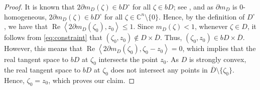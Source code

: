 \documentclass[11pt, oneside, reqno]{amsart}
\numberwithin{equation}{section}
\theoremstyle{definition}
\newcommand{\C}{\mathbb C}
\newcommand{\rea}{\operatorname{Re}}
\newcommand{\ltt}{\left(}
\newcommand{\rtt}{\right)}
\begin{document}
{\begin{proof}
It is known that $2\partial m_D(\zeta)\in bD^\circ$ for all $\zeta\in bD$; see {\cite[Section 2]{Li02}}, and as $\partial m_D$ is $0$-homogeneous, $2\partial m_D(\zeta)\in bD^\circ$ for all $\zeta\in\C^n\setminus\{0\}.$ Hence, by the definition of $D^\circ$, we have that $\rea\left\langle2\partial m_D(\zeta_0),z_0\right\rangle\leq 1$. Since $m_D(\zeta)<1$, whenever $\zeta\in D$, it follows from \eqref{eq:constraint} that $\ltt\zeta_0,z_0\rtt\notin{D}\times \overline D$. Thus,  $\ltt\zeta_0,z_0\rtt\in bD\times \overline{D}$. However, this means that $\rea\left\langle2\partial m_D(\zeta_0),\zeta_0-z_0\right\rangle=0$, which implies that the real tangent space to $bD$ at $\zeta_0$ intersects the point $z_0$. As $D$ is strongly convex, the real tangent space to $bD$ at $\zeta_0$ does not intersect any points in $\overline{D}\setminus\{\zeta_0\}$. Hence, $\zeta_0=z_0$, which proves our claim. %



\end{proof}}
\end{document}
